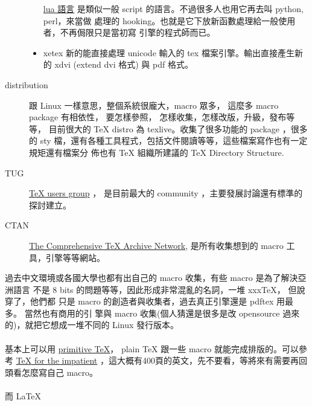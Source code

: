 \begin{description}
\begin{itemize}
      \href{https://en.wikipedia.org/wiki/Lua_(programming_language)}{lua 語言}
      是類似一般 script 的語言。不過很多人也用它再去叫 python, perl，來當做
      處理的 hooking。也就是它下放新函數處理給一般使用者，不再侷限只是當初寫
      引擎的程式師而已。
    \item xetex 新的能直接處理 unicode 輸入的 tex 檔案引擎。輸出直接產生新的
      xdvi (extend dvi 格式) 與 pdf 格式。%
  \end{itemize}
  \item [distribution] 跟 Linux 一樣意思，整個系統很龐大，macro 眾多， 這麼多
    macro package 有相依性， 要怎樣參照， 怎樣收集，怎樣改版，升級，發布等等，
    目前很大的 {\TeX} distro 為 texlive。收集了很多功能的 package ，很多的 sty
    檔，還有各種工具程式，包括文件閱讀等等，這些檔案寫作也有一定規矩還有檔案分
    佈也有 {\TeX} 組織所建議的 \TeX{} Directory Structure.
  \item [TUG] \href{http://tug.org}{{\TeX} users group} ，
    是目前最大的 community ，主要發展討論還有標準的探討建立。
  \item [CTAN] \href{http://www.ctan.org}
    {The Comprehensive \TeX{} Archive Network}, 
    是所有收集想到的 macro 工具，引擎等等網站。
\end{description}
過去中文環境或各國大學也都有出自己的 macro 收集，有些 macro 是為了解決亞洲語言
不是 8 bits 的問題等等，因此形成非常混亂的名詞，一堆 xxxTeX， 但說穿了，他們都
只是 macro 的創造者與收集者，過去真正引擎還是 pdftex 用最多。 當然也有商用的引
擎與 macro 收集(個人猜還是很多是改 opensource 過來的)，就把它想成一堆不同的
Linux 發行版本。
\\\\
基本上可以用 
\href{https://en.wikibooks.org/wiki/TeX}{primitive \TeX}， plain \TeX{} 跟一些
macro 就能完成排版的。可以參考
\href{https://ctan.org/tex-archive/info/impatient/book.pdf}
{{\TeX} for the impatient}
，這大概有400頁的英文，先不要看，等將來有需要再回頭看怎麼寫自己 macro。
\\\\
而 \LaTeX{}
